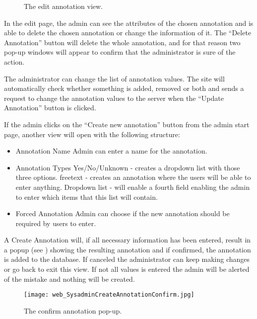 \begin{figure}[h]
 \caption{The edit annotation view.}
 \label{adm_web_editView}
\end{figure}
In the edit page, the admin can see the attributes of the chosen annotation and is able to delete the chosen annotation or change the information of it. The “Delete Annotation” button will delete the whole annotation, and for that reason two pop-up windows will appear to confirm that the administrator is sure of the action.

The administrator can change the list of annotation values. The site will automatically check whether something is added, removed or both and sends a request to change the annotation values to the server when the “Update Annotation” button is clicked.

If the admin clicks on the “Create new annotation” button from the admin start page, another view will open with the following structure:
\begin{itemize}
 \item Annotation Name
 \subitem Admin can enter a name for the annotation.
 
 \item Annotation Types
 \subitem Yes/No/Unknown - creates a dropdown list with those three options.
 \subitem freetext - creates an annotation where the users will be able to enter anything.
 \subitem Dropdown list - will enable a fourth field enabling the admin to enter which items that this list will contain.
 
 \item Forced Annotation
 \subitem Admin can choose if the new annotation should be required by users to enter. 
\end{itemize}

A Create Annotation will, if all necessary information has been entered, result in a popup (see ) showing the resulting annotation and if confirmed, the annotation is added to the database. 
If canceled the administrator can keep making changes or go back to exit this view. If not all values is entered the admin will be alerted of the mistake and nothing will be created.

\begin{figure}[h]
 \centering
 \texttt{[image: web\_SysadminCreateAnnotationConfirm.jpg]}
 \caption{The confirm annotation pop-up.}
 \label{adm_web_createPopup}
\end{figure}



